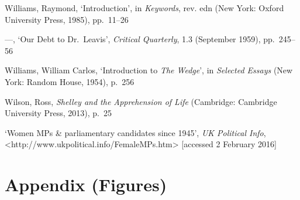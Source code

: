 \documentclass[]{article}
\begin{document}
Williams, Raymond, ‘Introduction’, in \emph{Keywords}, rev. edn (New
York: Oxford University Press, 1985), pp.~11–26

—, ‘Our Debt to Dr.~Leavis’, \emph{Critical Quarterly}, 1.3 (September
1959), pp.~245–56

Williams, William Carlos, ‘Introduction to \emph{The Wedge}’, in
\emph{Selected Essays} (New York: Random House, 1954), p.~256

Wilson, Ross, \emph{Shelley and the Apprehension of Life} (Cambridge:
Cambridge University Press, 2013), p.~25

‘Women MPs \& parliamentary candidates since 1945’, \emph{UK Political
Info},\\
\textless{}http://www.ukpolitical.info/FemaleMPs.htm\textgreater{}
{[}accessed 2 February 2016{]} \newpage

\section{Appendix (Figures)}\label{appendix-figures}

\newpage

\end{document}
